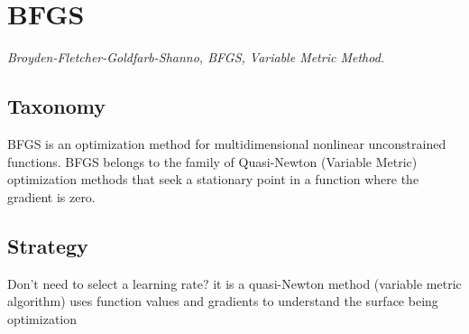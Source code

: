 
\section{BFGS} 
\label{sec:bfgs}

\emph{Broyden-Fletcher-Goldfarb-Shanno, BFGS, Variable Metric Method.}

\subsection{Taxonomy}
BFGS is an optimization method for multidimensional nonlinear unconstrained functions.
BFGS belongs to the family of Quasi-Newton (Variable Metric) optimization methods that seek a stationary point in a function where the gradient is zero.

\subsection{Strategy}

Don't need to select a learning rate?
it is a quasi-Newton method (variable metric algorithm)
uses function values and gradients to understand the surface being optimization

